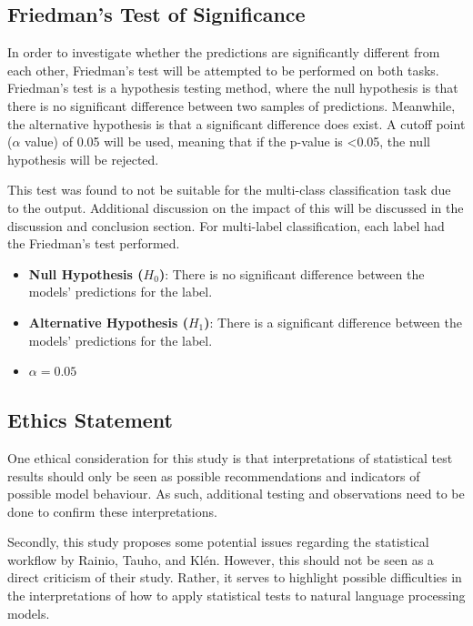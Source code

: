 \documentclass[10.7pt, onecolumn]{article}
\begin{document}
\subsection{Friedman's Test of Significance}
In order to investigate whether the predictions are significantly different from each other, Friedman's test will be attempted to be performed on both tasks. Friedman's test\cite{7c3c84e5-7230-3033-8b6c-ec430fb73d61}\cite{milton} is a hypothesis testing method, where the null hypothesis is that there is no significant difference between two samples of predictions\cite{HOFFMAN2015421}. Meanwhile, the alternative hypothesis is that a significant difference does exist. A cutoff point ($\alpha$ value) of 0.05 will be used, meaning that if the p-value is <0.05, the null hypothesis will be rejected.

This test was found to not be suitable for the multi-class classification task due to the output. Additional discussion on the impact of this will be discussed in the discussion and conclusion section. For multi-label classification, each label had the Friedman's test performed.

\begin{itemize}
  \item \textbf{Null Hypothesis (\(H_0\))}: There is no significant difference between the models' predictions for the label.

  \item \textbf{Alternative Hypothesis (\(H_1\))}: There is a significant difference between the models' predictions for the label.

  \item \( \alpha = 0.05 \)
\end{itemize}

\subsection{Ethics Statement}

One ethical consideration for this study is that interpretations of statistical test results should only be seen as possible recommendations and indicators of possible model behaviour. As such, additional testing and observations need to be done to confirm these interpretations.

Secondly, this study proposes some potential issues regarding the statistical workflow by Rainio, Tauho, and Klén\cite{statsBased}. However, this should not be seen as a direct criticism of their study. Rather, it serves to highlight possible difficulties in the interpretations of how to apply statistical tests to natural language processing models.
\end{document}
